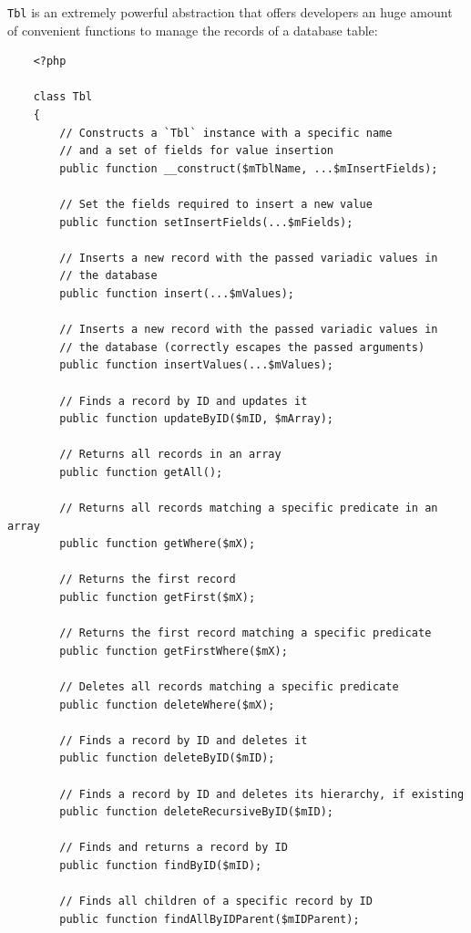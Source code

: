 \documentclass[12pt]{report}
\begin{document}
                    \texttt{Tbl} is an extremely powerful abstraction that offers developers an huge amount of convenient functions to manage the records of a database table:

                    \begin{verbatim}
    <?php

    class Tbl
    {
        // Constructs a `Tbl` instance with a specific name
        // and a set of fields for value insertion
        public function __construct($mTblName, ...$mInsertFields);

        // Set the fields required to insert a new value
        public function setInsertFields(...$mFields);

        // Inserts a new record with the passed variadic values in
        // the database
        public function insert(...$mValues);

        // Inserts a new record with the passed variadic values in
        // the database (correctly escapes the passed arguments)
        public function insertValues(...$mValues);

        // Finds a record by ID and updates it
        public function updateByID($mID, $mArray);

        // Returns all records in an array
        public function getAll();

        // Returns all records matching a specific predicate in an array
        public function getWhere($mX);

        // Returns the first record
        public function getFirst($mX);

        // Returns the first record matching a specific predicate
        public function getFirstWhere($mX);

        // Deletes all records matching a specific predicate
        public function deleteWhere($mX);

        // Finds a record by ID and deletes it
        public function deleteByID($mID);

        // Finds a record by ID and deletes its hierarchy, if existing
        public function deleteRecursiveByID($mID);
        
        // Finds and returns a record by ID
        public function findByID($mID);

        // Finds all children of a specific record by ID
        public function findAllByIDParent($mIDParent);


\end{verbatim}
\end{document}
